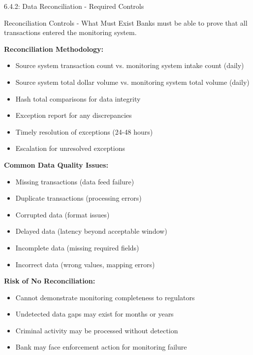 \documentclass[11pt,a4paper]{beamer}
\begin{document}
\begin{frame}{6.4.2: Data Reconciliation - Required Controls}
	\begin{block}{Reconciliation Controls - What Must Exist}
		Banks must be able to prove that all transactions entered the monitoring system.
	\end{block}
	\textbf{Reconciliation Methodology:}
	\begin{itemize}
		\item Source system transaction count vs. monitoring system intake count (daily)
		\item Source system total dollar volume vs. monitoring system total volume (daily)
		\item Hash total comparisons for data integrity
		\item Exception report for any discrepancies
		\item Timely resolution of exceptions (24-48 hours)
		\item Escalation for unresolved exceptions
	\end{itemize}
	\textbf{Common Data Quality Issues:}
	\begin{itemize}
		\item Missing transactions (data feed failure)
		\item Duplicate transactions (processing errors)
		\item Corrupted data (format issues)
		\item Delayed data (latency beyond acceptable window)
		\item Incomplete data (missing required fields)
		\item Incorrect data (wrong values, mapping errors)
	\end{itemize}
	\textbf{Risk of No Reconciliation:}
	\begin{itemize}
		\item Cannot demonstrate monitoring completeness to regulators
		\item Undetected data gaps may exist for months or years
		\item Criminal activity may be processed without detection
		\item Bank may face enforcement action for monitoring failure
	\end{itemize}
\end{frame}
\end{document}
